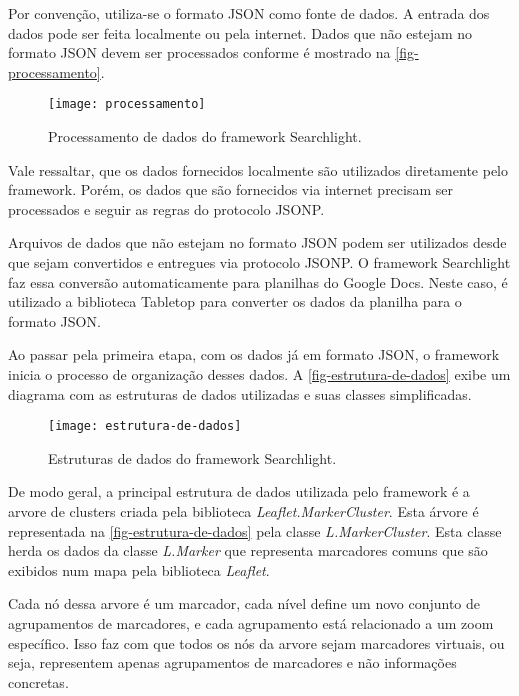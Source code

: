 	Por convenção, utiliza-se o formato JSON como fonte de dados. A entrada dos dados pode ser feita localmente ou pela internet. Dados que não estejam no formato JSON devem ser processados conforme é mostrado na \autoref{fig-processamento}. 
	
\begin{figure}[htb]
	\caption{\label{fig-processamento}Processamento de dados do framework Searchlight.}
	\begin{center}
	    \texttt{[image: processamento]}
	\end{center}
\end{figure}
	
	Vale ressaltar, que os dados fornecidos localmente são utilizados diretamente pelo framework. Porém,  os dados que são fornecidos via internet precisam ser processados e seguir as regras do protocolo JSONP. 
	
	Arquivos de dados que não estejam no formato JSON podem ser utilizados desde que sejam convertidos e entregues via protocolo JSONP. O framework Searchlight faz essa conversão automaticamente para planilhas do Google Docs. Neste caso, é utilizado a biblioteca Tabletop para converter os dados da planilha para o formato JSON.
	
	Ao passar pela primeira etapa, com os dados já em formato JSON, o framework inicia o processo de organização desses dados. A \autoref{fig-estrutura-de-dados} exibe um diagrama com as estruturas de dados utilizadas e suas classes simplificadas.
		
\begin{figure}[htb]
	\caption{\label{fig-estrutura-de-dados}Estruturas de dados do framework Searchlight.}
	\begin{center}
	    \texttt{[image: estrutura-de-dados]}
	\end{center}
\end{figure}

	De modo geral, a principal estrutura de dados utilizada pelo framework é a arvore de clusters criada pela biblioteca \textit{Leaflet.MarkerCluster}. Esta árvore é representada na \autoref{fig-estrutura-de-dados} pela classe \textit{L.MarkerCluster}. Esta classe herda os dados da classe \textit{L.Marker} que representa marcadores comuns que são exibidos num mapa pela biblioteca \textit{Leaflet}.  
	
	Cada nó dessa arvore é um marcador, cada nível define um novo conjunto de agrupamentos de marcadores, e cada agrupamento está relacionado a um zoom específico. Isso faz com que todos os nós da arvore sejam marcadores virtuais, ou seja, representem apenas agrupamentos de marcadores e não informações concretas. 
	
